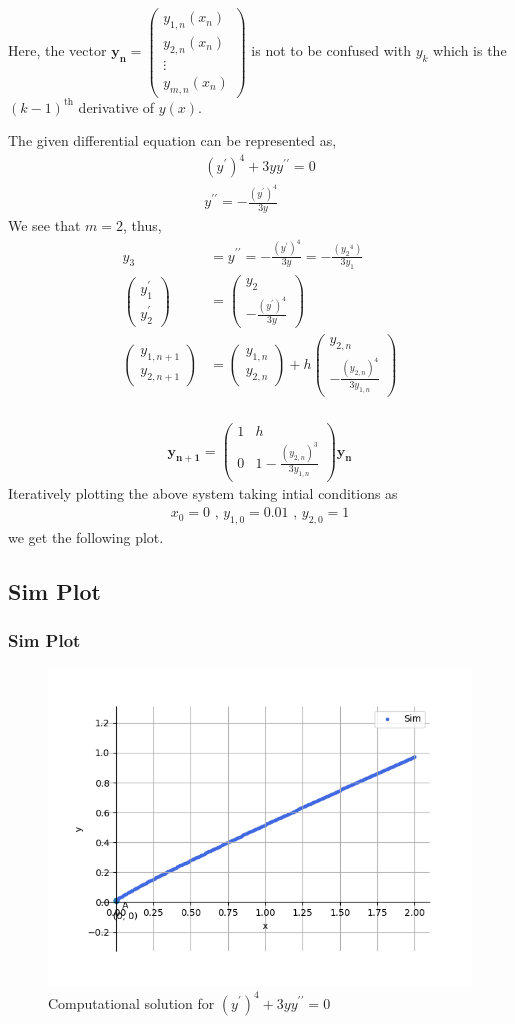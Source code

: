 \documentclass{beamer}
\providecommand{\brak}[1]{\ensuremath{\left(#1\right)}}
\theoremstyle{remark}
\newcommand{\myvec}[1]{\ensuremath{\begin{pmatrix}#1\end{pmatrix}}}
\let\vec\mathbf
\numberwithin{equation}{section}
\begin{document}
\begin{frame}
Here, the vector $\vec{y_n} = \myvec{y_{1, n}\brak{x_n}\\y_{2, n}\brak{x_n}\\\vdots\\y_{m, n}\brak{x_n}}$ is not to be confused with $y_k$ which is the $\brak{k - 1}^{\text{th}}$ derivative of $y\brak{x}$.
\end{frame}

\begin{frame}
The given differential equation can be represented as,
\begin{align}
    \brak{y^{\prime}}^4 + 3yy^{\prime\prime} = 0\\
    y^{\prime\prime} = -\frac{\brak{y^{\prime}}^4}{3y}
\end{align}
We see that $m = 2$, thus,
\begin{align}
    y_3 &= y^{\prime\prime} = -\frac{\brak{y^{\prime}}^4}{3y} = -\frac{\brak{{y_2}^4}}{3y_1}\\
    \myvec{y_1^{\prime}\\y_2^{\prime}} &= \myvec{y_2\\-\frac{\brak{y^{\prime}}^4}{3y}}\\
    \myvec{y_{1, n + 1}\\y_{2, n + 1}} &= \myvec{y_{1, n}\\y_{2, n}} + h\myvec{y_{2, n}\\-\frac{\brak{y_{2, n}}^4}{3y_{1, n}}}\\
\end{align}
\end{frame}

\begin{frame}
\begin{align}
    \vec{y_{n + 1}} = \myvec{1 & h\\0 & 1 -\frac{\brak{y_{2, n}}^3}{3y_{1, n}}} \vec{y_n}
\end{align}
Iteratively plotting the above system taking intial conditions as 
\begin{align}
    x_0 = 0 \text{ , } y_{1, 0} = 0.01 \text{ , } y_{2, 0} = 1
\end{align}
we get the following plot.
\end{frame}

\subsection{Sim Plot}
\begin{frame}
\frametitle{Sim Plot}
\begin{figure}[h!]
   \centering
   \includegraphics[width=0.7\linewidth]{figs/graph.png}
   \caption{Computational solution for $\brak{y^{\prime}}^4 + 3yy^{\prime\prime} = 0$}
\end{figure}
\end{frame}
\end{document}
